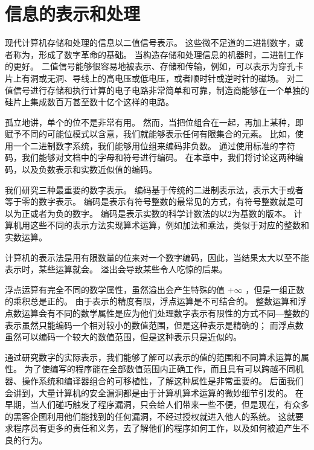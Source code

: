 \chapter{信息的表示和处理}
{
    现代计算机存储和处理的信息以二值信号表示。
    这些微不足道的二进制数字，或者称为，形成了数字革命的基础。
    当构造存储和处理信息的机器时，二进制工作的更好。
    二值信号能够很容易地被表示、存储和传输，例如，可以表示为穿孔卡片上有洞或无洞、导线上的高电压或低电压，或者顺时针或逆时针的磁场。
    对二值信号进行存储和执行计算的电子电路非常简单和可靠，制造商能够在一个单独的硅片上集成数百万甚至数十亿个这样的电路。

    孤立地讲，单个的位不是非常有用。
    然而，当把位组合在一起，再加上某种，即赋予不同的可能位模式以含意，我们就能够表示任何有限集合的元素。
    比如，使用一个二进制数字系统，我们能够用位组来编码非负数。
    通过使用标准的字符码，我们能够对文档中的字母和符号进行编码。
    在本章中，我们将讨论这两种编码，以及负数表示和实数近似值的编码。

    我们研究三种最重要的数字表示。
    编码基于传统的二进制表示法，表示大于或者等于零的数字表示。
    编码是表示有符号整数的最常见的方式，有符号整数就是可以为正或者为负的数字。
    编码是表示实数的科学计数法的以2为基数的版本。
    计算机用这些不同的表示方法实现算术运算，例如加法和乘法，类似于对应的整数和实数运算。

    计算机的表示法是用有限数量的位来对一个数字编码，因此，当结果太大以至不能表示时，某些运算就会。
    溢出会导致某些令人吃惊的后果。

    浮点运算有完全不同的数学属性，虽然溢出会产生特殊的值 $+ \infty$ ，但是一组正数的乘积总是正的。
    由于表示的精度有限，浮点运算是不可结合的。
    整数运算和浮点数运算会有不同的数学属性是应为他们处理数字表示有限性的方式不同---整数的表示虽然只能编码一个相对较小的数值范围，但是这种表示是精确的；
    而浮点数虽然可以编码一个较大的数值范围，但是这种表示只是近似的。

    通过研究数字的实际表示，我们能够了解可以表示的值的范围和不同算术运算的属性。
    为了使编写的程序能在全部数值范围内正确工作，而且具有可以跨越不同机器、操作系统和编译器组合的可移植性，了解这种属性是非常重要的。
    后面我们会讲到，大量计算机的安全漏洞都是由于计算机算术运算的微妙细节引发的。
    在早期，当人们碰巧触发了程序漏洞，只会给人们带来一些不便，但是现在，有众多的黑客企图利用他们能找到的任何漏洞，不经过授权就进入他人的系统。
    这就要求程序员有更多的责任和义务，去了解他们的程序如何工作，以及如何被迫产生不良的行为。

}
